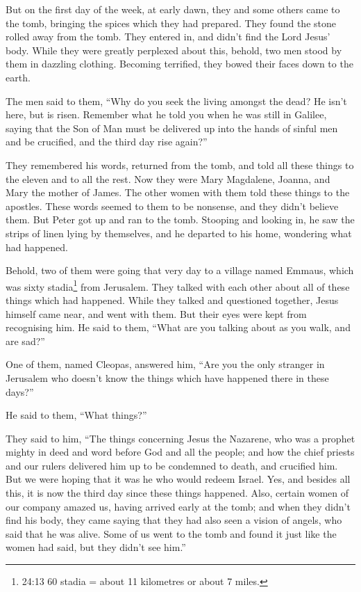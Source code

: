  But on the first day of the week, at early dawn, they and
some others came to the tomb, bringing the spices which they had
prepared.  They found the stone rolled away from the tomb.
 They entered in, and didn't find the Lord Jesus' body.
 While they were greatly perplexed about this, behold, two
men stood by them in dazzling clothing.  Becoming terrified,
they bowed their faces down to the earth.

The men said to them, ``Why do you seek the living amongst the dead?
 He isn't here, but is risen. Remember what he told you when
he was still in Galilee,  saying that the Son of Man must be
delivered up into the hands of sinful men and be crucified, and the
third day rise again?''

 They remembered his words,  returned from the
tomb, and told all these things to the eleven and to all the rest.
 Now they were Mary Magdalene, Joanna, and Mary the mother
of James. The other women with them told these things to the apostles.
 These words seemed to them to be nonsense, and they didn't
believe them.  But Peter got up and ran to the tomb.
Stooping and looking in, he saw the strips of linen lying by themselves,
and he departed to his home, wondering what had happened.

 Behold, two of them were going that very day to a village
named Emmaus, which was sixty stadia\footnote{24:13 60 stadia = about 11
  kilometres or about 7 miles.} from Jerusalem.  They
talked with each other about all of these things which had happened.
 While they talked and questioned together, Jesus himself
came near, and went with them.  But their eyes were kept
from recognising him.  He said to them, ``What are you
talking about as you walk, and are sad?''

 One of them, named Cleopas, answered him, ``Are you the
only stranger in Jerusalem who doesn't know the things which have
happened there in these days?''

 He said to them, ``What things?''

They said to him, ``The things concerning Jesus the Nazarene, who was a
prophet mighty in deed and word before God and all the people;
 and how the chief priests and our rulers delivered him up
to be condemned to death, and crucified him.  But we were
hoping that it was he who would redeem Israel. Yes, and besides all
this, it is now the third day since these things happened. 
Also, certain women of our company amazed us, having arrived early at
the tomb;  and when they didn't find his body, they came
saying that they had also seen a vision of angels, who said that he was
alive.  Some of us went to the tomb and found it just like
the women had said, but they didn't see him.''

